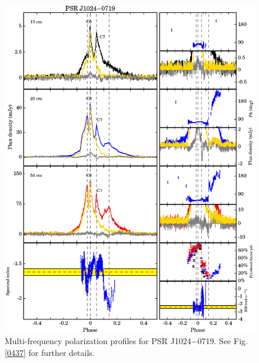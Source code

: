 \documentclass[useAMS,usenatbib]{mn2e}
\begin{document}
\begin{appendix}
\begin{figure}
\begin{center}
\includegraphics[width=6 in]{1024.ps}
\caption{Multi-frequency polarization profiles for PSR J1024$-$0719. 
See Fig. \ref{0437} for further details.}
\label{1024}
\end{center}
\end{figure}


\end{appendix}
\end{document}

